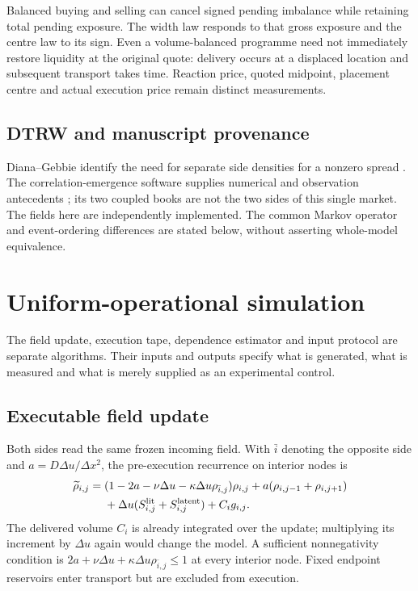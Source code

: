 \documentclass[11pt,a4paper]{article}
\newcommand{\du}{\Delta u}\newcommand{\dx}{\Delta x}\newcommand{\lap}{\delta_x^2}
\begin{document}
Balanced buying and selling can cancel signed pending imbalance while retaining total pending exposure. The width law responds to that gross exposure and the centre law to its sign. Even a volume-balanced programme need not immediately restore liquidity at the original quote: delivery occurs at a displaced location and subsequent transport takes time. Reaction price, quoted midpoint, placement centre and actual execution price remain distinct measurements.

\subsection{DTRW and manuscript provenance}
Diana--Gebbie identify the need for separate side densities for a nonzero spread \cite{cam}. The correlation-emergence software supplies numerical and observation antecedents \cite{ag,code}; its two coupled books are not the two sides of this single market. The fields here are independently implemented. The common Markov operator and event-ordering differences are stated below, without asserting whole-model equivalence.

\clearpage
\section{Uniform-operational simulation}
The field update, execution tape, dependence estimator and input protocol are separate algorithms. Their inputs and outputs specify what is generated, what is measured and what is merely supplied as an experimental control.

\subsection{Executable field update}
Both sides read the same frozen incoming field. With $\bar i$ denoting the opposite side and $a=D\du/\dx^2$, the pre-execution recurrence on interior nodes is
\begin{equation}\label{eq:recurrence}
\begin{split}
\widetilde\rho_{i,j}={}&(1-2a-\nu\du-\kappa\du\rho_{\bar i,j})\rho_{i,j}
+a(\rho_{i,j-1}+\rho_{i,j+1})\\
&+\du(S_{i,j}^{\rm lit}+S_{i,j}^{\rm latent})+C_i g_{i,j}.
\end{split}
\end{equation}
The delivered volume $C_i$ is already integrated over the update; multiplying its increment by $\du$ again would change the model. A sufficient nonnegativity condition is $2a+\nu\du+\kappa\du\rho_{\bar i,j}\leq1$ at every interior node. Fixed endpoint reservoirs enter transport but are excluded from execution.
\end{document}

